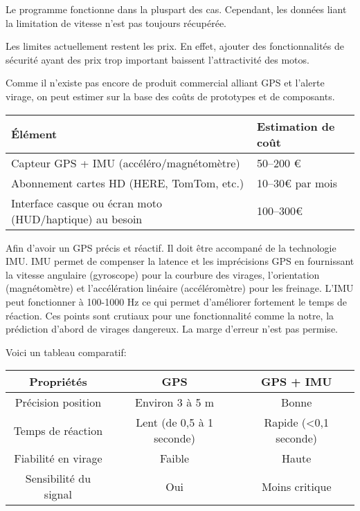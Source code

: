 
Le programme fonctionne dans la pluspart des cas. Cependant, les données liant la limitation de vitesse n'est pas toujours récupérée.

Les limites actuellement restent les prix. En effet, ajouter des fonctionnalités de sécurité ayant des prix trop important baissent l'attractivité des motos. 


Comme il n’existe pas encore de produit commercial alliant GPS et l'alerte virage, on peut estimer sur la base des coûts de prototypes et de composants.\\

\begin{tabular}{|l|l|}
\hline
\textbf{Élément} & \textbf{Estimation de coût} \\
\hline
Capteur GPS + IMU (accéléro/magnétomètre)  & 50–200 € \\
Abonnement cartes HD (HERE, TomTom, etc.) &    10–30€ par mois   \\
Interface casque ou écran moto (HUD/haptique) au besoin & 100–300€ \\
\hline
\end{tabular}

\vspace{0.5cm}
Afin d'avoir un GPS précis et réactif. Il doit être accompané de la technologie IMU. IMU permet de compenser la latence et les imprécisions GPS en fournissant la vitesse angulaire (gyroscope) pour la courbure des virages, l'orientation (magnétomètre) et l'accélération linéaire (accéléromètre) pour les freinage. L'IMU peut fonctionner à 100-1000 Hz ce qui permet d'améliorer fortement le temps de réaction. Ces points sont crutiaux pour une fonctionnalité comme la notre, la prédiction d'abord de virages dangereux. La marge d'erreur n'est pas permise.

Voici un tableau comparatif:\\
\begin{tabular}{|c|c|c|}
\hline
\textbf{Propriétés} & \textbf{GPS} & \textbf{GPS + IMU} \\
\hline
Précision position & Environ 3 à 5 m & Bonne \\
Temps de réaction & Lent (de 0,5 à 1 seconde) & Rapide (<0,1 seconde)\\
Fiabilité en virage & Faible & Haute \\
Sensibilité du signal & Oui & Moins critique \\
\hline
\end{tabular}

